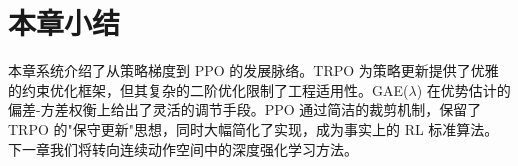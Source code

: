 \section{本章小结}

本章系统介绍了从策略梯度到 PPO 的发展脉络。TRPO 为策略更新提供了优雅的约束优化框架，但其复杂的二阶优化限制了工程适用性。GAE($\lambda$) 在优势估计的偏差-方差权衡上给出了灵活的调节手段。PPO 通过简洁的裁剪机制，保留了 TRPO 的"保守更新"思想，同时大幅简化了实现，成为事实上的 RL 标准算法。下一章我们将转向连续动作空间中的深度强化学习方法。

